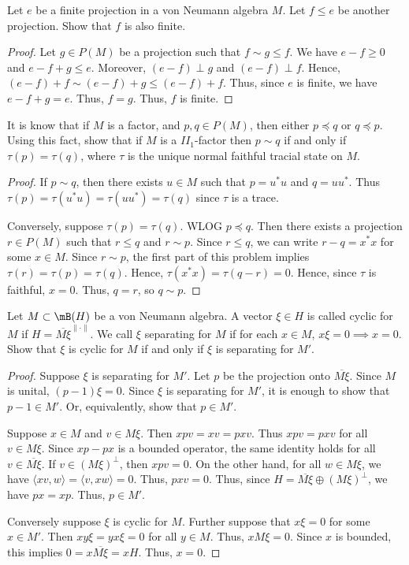 \documentclass{article}
\begin{document}
 Let $e$ be a finite projection in a von Neumann algebra $M$. Let $f \le e$ be another projection.  Show that $f$ is also finite.
\begin{proof}
  Let $g \in P(M)$ be a projection such that $f \sim g \le f$. We have $e - f \ge 0$ and $e - f + g \le e$.  Moreover, $(e - f) \perp g$ and $(e - f) \perp f$.  Hence,
  $(e - f) + f \sim (e -f) + g \le (e-f) + f$.
  Thus, since $e$ is finite, we have $e -f + g = e$.  Thus, $f = g$.  Thus, $f$ is finite.
\end{proof}


 It is know that if $M$ is a factor, and $p,q \in P(M)$, then either $p \preceq q$ or $q \preceq p$. Using this fact, show that if $M$ is a $II_1$-factor then $p \sim q$ if and only if $\tau(p) = \tau(q)$, where $\tau$ is the unique normal faithful tracial state on $M$.
\begin{proof}
  If $p \sim q$, then there exists $u \in M$ such that $p = u^*u$ and $q = u u^*$.  Thus $\tau(p) = \tau(u^* u) = \tau(u u^*) = \tau(q)$ since $\tau$ is a trace.

  Conversely, suppose $\tau(p) = \tau(q)$.  WLOG $p \preceq q$.  Then there exists a projection $r \in P(M)$ such that $r \le q$ and $r \sim p$.  Since $r \le q$, we can write $r - q = x^* x$ for some $x \in M$.  Since $r \sim p$, the first part of this problem implies $\tau(r) = \tau(p) = \tau(q)$.  Hence, $\tau(x^*x) = \tau(q - r) = 0$. Hence, since $\tau$ is faithful, $x = 0$.  Thus, $q = r$, so $q \sim p$.
\end{proof}

 Let $M \subset \mB(H)$ be a von Neumann algebra. A vector $\xi \in H$ is called cyclic for $M$ if $H = \overline{M \xi}^{\lVert \cdot \rVert}$. We call $\xi$ separating for $M$ if for each $x \in M$, $x \xi = 0 \implies x = 0$. Show that $\xi$ is cyclic for $M$ if and only if $\xi$ is separating for $M'$.
\begin{proof}
  Suppose $\xi$ is separating for $M'$.  Let $p$ be the projection onto $\overline{M \xi}$.   Since $M$ is unital, $(p - 1) \xi = 0$.  Since $\xi$ is separating for $M'$, it is enough to show that $p - 1 \in M'$.  Or, equivalently, show that $p \in M'$.

  Suppose $x \in M$ and $v \in M \xi$.  Then $xpv = xv = pxv$.  Thus $xpv = pxv$ for all $v \in M \xi$.  Since $xp - px$ is a bounded operator, the same identity holds for all $v \in \overline{M \xi}$.  If $v \in (M \xi)^\perp$, then
  $xpv = 0$.  On the other hand, for all $w \in M \xi$, we have $\langle xv, w \rangle = \langle v, xw \rangle = 0$.  Thus, $pxv = 0$.  Thus, since $H = \overline{M \xi} \oplus (M \xi)^\perp$, we have $px = xp$.  Thus, $p \in M'$.

  Conversely suppose $\xi$ is cyclic for $M$.  Further suppose that $x \xi = 0$ for some $x \in M'$.  Then $x y \xi = y x \xi = 0$ for all $y \in M$.
  Thus, $x M \xi = 0$.  Since $x$ is bounded, this implies $0 = x \overline{M \xi} = x H$.  Thus, $x = 0$.   

\end{proof}
\end{document}
